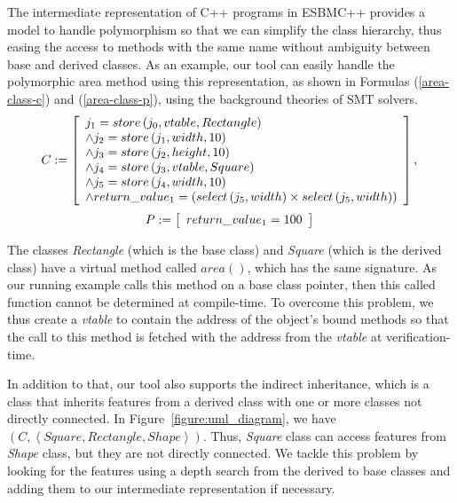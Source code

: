 \documentclass[a4paper]{llncs}
\begin{document}
The intermediate representation of C++ programs in ESBMC++ provides a model
to handle polymorphism so that we can simplify the class hierarchy,
thus easing the access to methods with the same name without ambiguity between
base and derived classes. As an example, our tool can easily handle the polymorphic
area method using this representation, as shown in Formulas (\ref{area-class-c}) and
(\ref{area-class-p}), using the background theories of SMT solvers.
%
\begin{equation}
\label{area-class-c}
C := \left [ \begin{array}{ll}
        j_{1} = store\left(j_{0}, vtable, Rectangle\right) \\
        \wedge j_{2} = store\left(j_{1}, width, 10\right) \\
        \wedge j_{3} = store\left(j_{2}, height, 10\right) \\
        \wedge j_{4} = store\left(j_{3}, vtable, Square\right) \\
        \wedge j_{5} = store\left(j_{4}, width, 10\right) \\
        \wedge return\_value_{1} = \left(select\left(j_{5}, width\right) \times select\left(j_{5}, width\right)\right) \\
              \end{array} \right ],  \\
\end{equation}
%
\begin{equation}
\label{area-class-p}
P := \left [ \begin{array}{ll}
              return\_value_{1} = 100 \\
              \end{array} \right ]  \\
\end{equation}
%

The classes \textit{Rectangle} (which is the base class)
and \textit{Square} (which is the derived class) have a virtual method
called $area\left(\right)$, which has the same signature. As our running example
calls this method on a base class pointer, then this called function
cannot be determined at compile-time. To overcome this problem,
we thus create a \textit{vtable} to contain the address of the object's bound
methods so that the call to this method is fetched with the address from
the \textit{vtable} at verification-time.

In addition to that, our tool also supports the indirect inheritance,
which is a class that inherits features from a derived class with one
or more classes not directly connected. In Figure~\ref{figure:uml_diagram}, we have
$\left(C, \left\langle Square, Rectangle, Shape \right\rangle \right)$.
Thus, \textit{Square} class can access features from \textit{Shape} class,
but they are not directly connected. We tackle this problem by
looking for the features using a depth search from the derived to base classes
and adding them to our intermediate representation if necessary.
\end{document}
